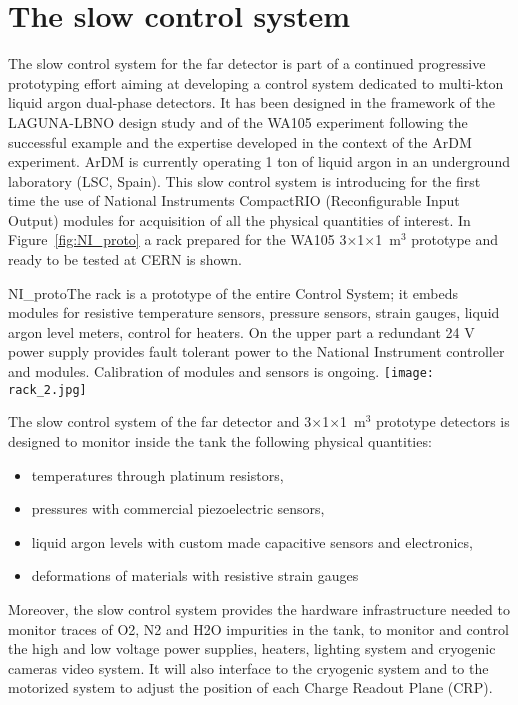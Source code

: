 \section{The slow control system} 
\label{sec:detectors-fd-alt-dcs}

The slow control system for the far detector is part of a continued
progressive prototyping effort aiming at developing a control system
dedicated to multi-kton liquid argon dual-phase detectors. It has
been designed in the framework of the LAGUNA-LBNO design study and of
the WA105 experiment following the successful example and the
expertise developed in the context of the ArDM
experiment\cite{Badertscher:2013ygt}. ArDM is currently operating 1
ton of liquid argon in an underground laboratory (LSC, Spain). This
slow control system is introducing for the first time the use of
National Instruments CompactRIO (Reconfigurable Input Output) modules
for acquisition of all the physical quantities of interest. In
Figure~\ref{fig:NI_proto} a rack prepared for the WA105
3$\times$1$\times$1~m$^3$ prototype and ready to be tested at CERN is
shown.
\begin{cdrfigure}{NI_proto}{The rack is a 
prototype of the entire Control System; it  embeds modules for resistive 
temperature sensors, pressure  sensors, strain gauges, liquid argon level 
meters, control for  heaters. On the upper part a redundant 24 V power supply 
provides fault tolerant power to the National Instrument controller and modules. 
Calibration of modules and sensors is ongoing.}
\texttt{[image: rack\_2.jpg]}
\end{cdrfigure}

The slow control system of the far detector and
3$\times$1$\times$1~m$^3$ prototype detectors is designed to monitor
inside the tank the following physical quantities:
\begin{itemize}
 \item temperatures through platinum resistors,
 \item pressures with commercial piezoelectric sensors,
 \item liquid argon levels with custom made capacitive sensors and electronics,
 \item deformations of materials with resistive strain gauges
\end{itemize} 

Moreover, the slow control system provides the hardware infrastructure
needed to monitor traces of O2, N2 and H2O impurities in the tank, to
monitor and control the high and low voltage power supplies, heaters,
lighting system and cryogenic cameras video system. It will also
interface to the cryogenic system and to the motorized system to
adjust the position of each Charge Readout Plane (CRP).

